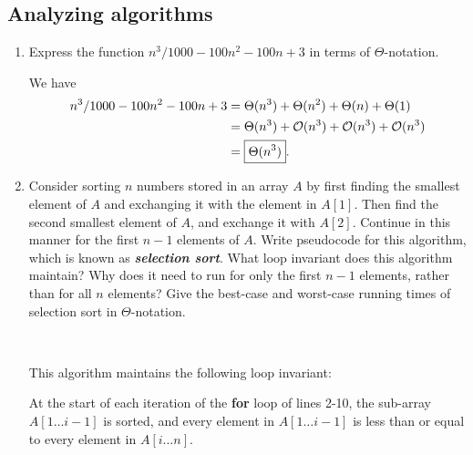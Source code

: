 \documentclass[Chapter02]{subfiles}
\begin{document}
	\subsection{Analyzing algorithms}

	\begin{enumerate}
		\item Express the function $n^3/1000 - 100n^2 - 100n + 3$ in terms of $\Theta$-notation.
		\begin{answer}
			We have
			\begin{align*}
				n^3/1000 - 100n^2 - 100n + 3 &= \Theta(n^3) + \Theta(n^2) + \Theta(n) + \Theta(1)\\
					&= \Theta(n^3) + \mathcal{O}(n^3) + \mathcal{O}(n^3) + \mathcal{O}(n^3)\\
					&= \boxed{\Theta(n^3)}.
			\end{align*}
		\end{answer}

		\item Consider sorting $n$ numbers stored in an array $A$ by first finding the smallest element of $A$ and exchanging it with the element in $A[1]$. Then find the second smallest element of $A$, and exchange it with $A[2]$. Continue in this manner for the first $n - 1$ elements of $A$. Write pseudocode for this algorithm, which is known as \textbf{\textit{selection sort}}. What loop invariant does this algorithm maintain? Why does it need to run for only the first $n - 1$ elements, rather than for all $n$ elements? Give the best-case and worst-case running times of selection sort in $\Theta$-notation.
		\begin{answer}
			\hfill\\
			\begin{algorithm}[H]

			\end{algorithm}

			This algorithm maintains the following loop invariant:
			\begin{addmargin}[2em]{2em}
				At the start of each iteration of the \textbf{for} loop of lines 2-10, the sub-array $A[1 \dots i - 1]$ is sorted, and every element in $A[1 \dots i - 1]$ is less than or equal to every element in $A[i \dots n]$.
			\end{addmargin}


\end{answer}
\end{enumerate}
\end{document}

